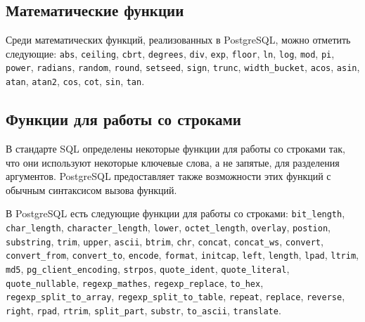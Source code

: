 \documentclass[a4paper,12pt,notitlepage,headsepline,pdftex]{scrartcl}
\begin{document}
  \subsection{Математические функции}
    Среди математических функций, реализованных в PostgreSQL, можно отметить
    следующие:
    \verb'abs', \verb'ceiling', \verb'cbrt', \verb'degrees', \verb'div',
    \verb'exp', \verb'floor', \verb'ln', \verb'log', \verb'mod', \verb'pi',
    \verb'power', \verb'radians', \verb'random', \verb'round', \verb'setseed',
    \verb'sign', \verb'trunc', \verb'width_bucket', \verb'acos', \verb'asin',
    \verb'atan', \verb'atan2', \verb'cos', \verb'cot', \verb'sin', \verb'tan'.

  \subsection{Функции для работы со строками}
    В стандарте SQL определены некоторые функции для работы со строками так,
    что они используют некоторые ключевые слова, а не запятые, для разделения
    аргументов.
    PostgreSQL предоставляет также возможности этих функций с обычным
    синтаксисом вызова функций.

    В PostgreSQL есть следующие функции для работы со строками:
    \verb'bit_length', \verb'char_length', \verb'character_length',
    \verb'lower', \verb'octet_length', \verb'overlay', \verb'postion',
    \verb'substring', \verb'trim', \verb'upper', \verb'ascii', \verb'btrim',
    \verb'chr', \verb'concat', \verb'concat_ws', \verb'convert',
    \verb'convert_from', \verb'convert_to', \verb'encode', \verb'format',
    \verb'initcap', \verb'left', \verb'length', \verb'lpad', \verb'ltrim',
    \verb'md5', \verb'pg_client_encoding', \verb'strpos', \verb'quote_ident',
    \verb'quote_literal', \verb'quote_nullable', \verb'regexp_mathes',
    \verb'regexp_replace', \verb'to_hex', \verb'regexp_split_to_array',
    \verb'regexp_split_to_table', \verb'repeat', \verb'replace',
    \verb'reverse', \verb'right', \verb'rpad', \verb'rtrim',
    \verb'split_part', \verb'substr', \verb'to_ascii',
    \verb'translate'.

  \pagebreak
\end{document}
